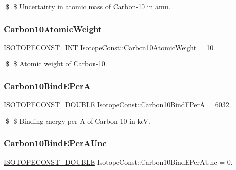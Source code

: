 \$ \$ Uncertainty in atomic mass of Carbon-\/10 in amu. \mbox{\label{group___isotope_const-_carbon-_c10_ga2c600bac2b9d9c40459224079502c8f9}} 
\subsubsection{\texorpdfstring{Carbon10\+Atomic\+Weight}{Carbon10AtomicWeight}}
{\footnotesize\ttfamily \mbox{\hyperlink{group___isotope_const-_macros_ga5f18360b3e99483a35c32d789e62621c}{I\+S\+O\+T\+O\+P\+E\+C\+O\+N\+S\+T\+\_\+\+I\+NT}} Isotope\+Const\+::\+Carbon10\+Atomic\+Weight = 10}

\$ \$ Atomic weight of Carbon-\/10. \mbox{\label{group___isotope_const-_carbon-_c10_ga75da6aa0fb133ff8f904101ffda4ca8f}} 
\subsubsection{\texorpdfstring{Carbon10\+Bind\+E\+PerA}{Carbon10BindEPerA}}
{\footnotesize\ttfamily \mbox{\hyperlink{group___isotope_const-_macros_ga8f45a7272ce02c0b4c65c44636ed719a}{I\+S\+O\+T\+O\+P\+E\+C\+O\+N\+S\+T\+\_\+\+D\+O\+U\+B\+LE}} Isotope\+Const\+::\+Carbon10\+Bind\+E\+PerA = 6032.}

\$ \$ Binding energy per A of Carbon-\/10 in keV. \mbox{\label{group___isotope_const-_carbon-_c10_gad8d111d7facfb72ac1f70e3885ef8411}} 
\subsubsection{\texorpdfstring{Carbon10\+Bind\+E\+Per\+A\+Unc}{Carbon10BindEPerAUnc}}
{\footnotesize\ttfamily \mbox{\hyperlink{group___isotope_const-_macros_ga8f45a7272ce02c0b4c65c44636ed719a}{I\+S\+O\+T\+O\+P\+E\+C\+O\+N\+S\+T\+\_\+\+D\+O\+U\+B\+LE}} Isotope\+Const\+::\+Carbon10\+Bind\+E\+Per\+A\+Unc = 0.}


